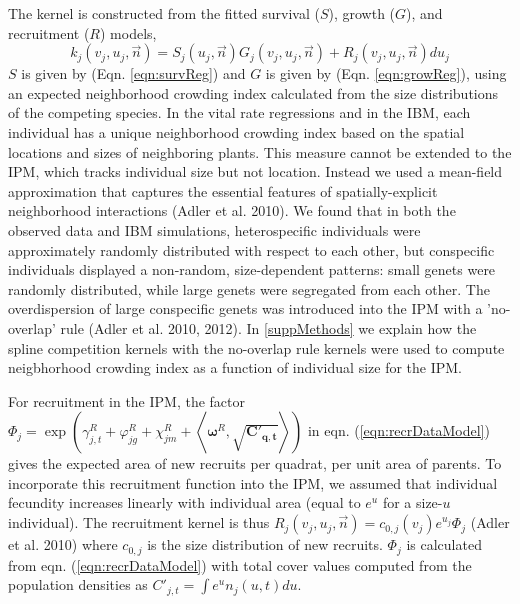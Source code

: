 \documentclass[11pt]{article}
\begin{document}
\begin{doublespacing}
The kernel is constructed from the fitted survival ($S$), growth ($G$), and recruitment ($R$) models, 
\begin{equation}
k_j(v_j,u_j,\vec{n})=S_j(u_j,\vec{n})G_j(v_j,u_j,\vec{n})+R_j(v_j,u_j,\vec{n}) du_j
\label{eqn:IPM} 
\end{equation}
$S$ is given by (Eqn. \ref{eqn:survReg}) and $G$ is given by (Eqn. \ref{eqn:growReg}), using an expected neighborhood crowding
index calculated from the size distributions of the competing species. In the vital rate regressions and in the IBM, each 
individual has a unique neighborhood crowding index based on the spatial locations and sizes of neighboring plants. This 
measure cannot be extended to the IPM, which tracks individual size but not location. Instead we used a 
mean-field approximation that captures the essential features of spatially-explicit neighborhood interactions (Adler et al. 2010). 
We found that in both the observed data and IBM simulations, heterospecific individuals were approximately randomly distributed with respect to each other, 
but conspecific individuals displayed a non-random, size-dependent patterns: small genets were randomly distributed, while large genets 
were segregated from each other. The overdispersion of large conspecific genets was introduced into the IPM 
with a 'no-overlap' rule (Adler et al. 2010, 2012). In \ref{suppMethods} we explain how the spline competition kernels with 
the no-overlap rule kernels were used to compute neigbhorhood crowding index as a function of individual size for the IPM.  

For recruitment in the IPM, the factor $ \Phi_j  = \exp{\left(\gamma_{j,t}^R +  \varphi_{jg}^R + \chi_{jm}^R + 
\left \langle \boldsymbol{\omega}^R , \boldsymbol{\sqrt{C'_{q,t}}} \right \rangle \right) }$
in eqn. (\ref{eqn:recrDataModel}) gives the expected 
area of new recruits per quadrat, per unit area of parents. To incorporate this recruitment function into the IPM, 
we assumed that individual fecundity increases linearly with individual area (equal to $e^u$ for a size-$u$ individual). The recruitment kernel is thus
$R_j(v_j,u_j,\vec{n})=c_{0,j}(v_j)e^{u_j}\Phi_j$ (Adler et al. 2010) where $c_{0,j}$ is the
size distribution of new recruits. $\Phi_j$ is calculated from eqn. (\ref{eqn:recrDataModel}) with total cover values
computed from the population densities as $C'_{j,t} = \int e^u n_j(u,t) du$. 


\end{doublespacing}
\end{document}

